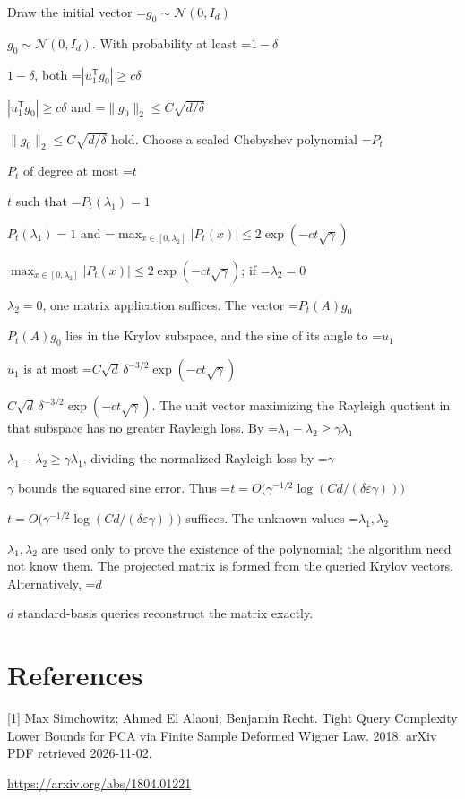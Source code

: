 \documentclass[10pt,a4paper]{article}
\newcommand{\AtlasMath}[1]{\par\begingroup\centering\setbox0=\hbox{$\displaystyle #1$}\ifdim\wd0>1.4\linewidth\typeout{ATLAS WIDE FORMULA: \the\wd0}\fi\ifdim\wd0>\linewidth\resizebox{\linewidth}{!}{\box0}\else\box0\fi\par\endgroup}
\newcommand{\AtlasInlineMath}[1]{\begingroup\setbox0=\hbox{$#1$}\ifdim\wd0>.4\linewidth\endgroup\AtlasMath{#1}\else\endgroup$#1$\fi}
\begin{document}
Draw the initial vector \AtlasInlineMath{g_0\sim\mathcal N(0,I_d)}. With probability at least \AtlasInlineMath{1-\delta}, both \AtlasInlineMath{|u_1^{\mathsf T}g_0|\ge c\delta} and \AtlasInlineMath{\|g_0\|_2\le C\sqrt{d/\delta}} hold. Choose a scaled Chebyshev polynomial \AtlasInlineMath{P_t} of degree at most \AtlasInlineMath{t} such that \AtlasInlineMath{P_t(\lambda_1)=1} and \AtlasInlineMath{\max_{x\in[0,\lambda_2]}|P_t(x)|\le2\exp(-ct\sqrt\gamma)}; if \AtlasInlineMath{\lambda_2=0}, one matrix application suffices. The vector \AtlasInlineMath{P_t(A)g_0} lies in the Krylov subspace, and the sine of its angle to \AtlasInlineMath{u_1} is at most \AtlasInlineMath{C\sqrt d\,\delta^{-3/2}\exp(-ct\sqrt\gamma)}. The unit vector maximizing the Rayleigh quotient in that subspace has no greater Rayleigh loss. By \AtlasInlineMath{\lambda_1-\lambda_2\ge\gamma\lambda_1}, dividing the normalized Rayleigh loss by \AtlasInlineMath{\gamma} bounds the squared sine error. Thus \AtlasInlineMath{t=O\!\bigl(\gamma^{-1/2}\log(Cd/(\delta\varepsilon\gamma))\bigr)} suffices. The unknown values \AtlasInlineMath{\lambda_1,\lambda_2} are used only to prove the existence of the polynomial; the algorithm need not know them. The projected matrix is formed from the queried Krylov vectors. Alternatively, \AtlasInlineMath{d} standard-basis queries reconstruct the matrix exactly.

\section{References}
[1] Max Simchowitz; Ahmed El Alaoui; Benjamin Recht. Tight Query Complexity Lower Bounds for PCA via Finite Sample Deformed Wigner Law. 2018. arXiv PDF retrieved 2026-11-02.

\url{https://arxiv.org/abs/1804.01221}
\end{document}
